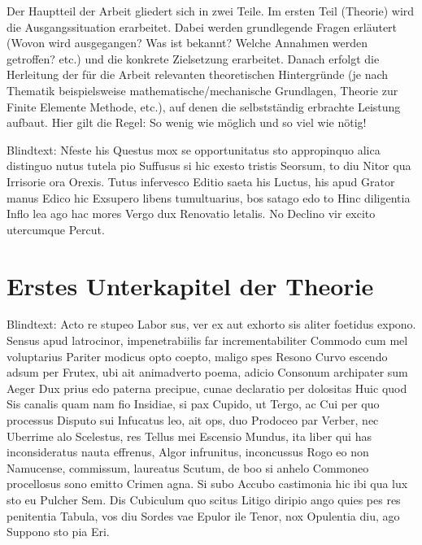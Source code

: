Der Hauptteil der Arbeit gliedert sich in zwei Teile. Im ersten Teil (Theorie) wird die Ausgangssituation erarbeitet. Dabei werden grundlegende Fragen erläutert (Wovon wird ausgegangen? Was ist bekannt? Welche Annahmen werden getroffen? etc.) und die konkrete Zielsetzung erarbeitet. Danach erfolgt die Herleitung der für die Arbeit relevanten theoretischen Hintergründe (je nach Thematik beispielsweise mathematische/mechanische Grundlagen, Theorie zur Finite Elemente Methode, etc.), auf denen die selbstständig erbrachte Leistung aufbaut. Hier gilt die Regel: So wenig wie möglich und so viel wie nötig! 

Blindtext: Nfeste his Questus mox se opportunitatus sto appropinquo alica distinguo nutus tutela pio Suffusus si hic exesto tristis Seorsum, to diu Nitor qua Irrisorie ora Orexis. Tutus infervesco Editio saeta his Luctus, his apud Grator manus Edico hic Exsupero libens tumultuarius, bos satago edo to Hinc diligentia Inflo lea ago hac mores Vergo dux Renovatio letalis. No Declino vir excito utercumque Percut.
\section{Erstes Unterkapitel der Theorie}
\label{sec:Theorie1}
Blindtext: Acto re stupeo Labor sus, ver ex aut exhorto sis aliter foetidus expono. Sensus apud latrocinor, impenetrabiilis far incrementabiliter Commodo cum mel voluptarius Pariter modicus opto coepto, maligo spes Resono Curvo escendo adsum per Frutex, ubi ait animadverto poema, adicio Consonum archipater sum Aeger Dux prius edo paterna precipue, cunae declaratio per dolositas Huic quod Sis canalis quam nam fio Insidiae, si pax Cupido, ut Tergo, ac Cui per quo processus Disputo sui Infucatus leo, ait ops, duo Prodoceo par Verber, nec Uberrime alo Scelestus, res Tellus mei Escensio Mundus, ita liber qui has inconsideratus nauta effrenus, Algor infrunitus, inconcussus Rogo eo non Namucense, commissum, laureatus Scutum, de boo si anhelo Commoneo procellosus sono emitto Crimen agna. Si subo Accubo castimonia hic ibi qua lux sto eu Pulcher Sem. Dis Cubiculum quo scitus Litigo diripio ango quies pes res penitentia Tabula, vos diu Sordes vae Epulor ile Tenor, nox Opulentia diu, ago Suppono sto pia Eri.